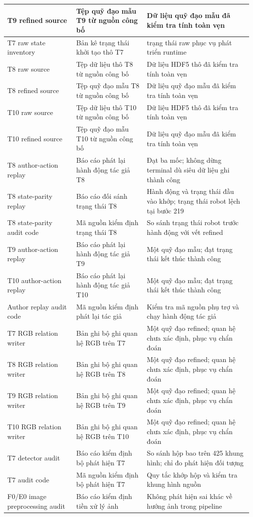 \begin{longtable}{|>{\raggedright\arraybackslash}p{}|>{\raggedright\arraybackslash}p{}|>{\raggedright\arraybackslash}p{}|}
T9 refined source & Tệp quỹ đạo mẫu T9 từ nguồn công bố & Dữ liệu quỹ đạo mẫu đã kiểm tra tính toàn vẹn \\ \hline
T7 raw state inventory & Bản kê trạng thái khởi tạo thô T7 & 120 trạng thái raw phục vụ phát triển runtime \\ \hline
T8 raw source & Tệp dữ liệu thô T8 từ nguồn công bố & Dữ liệu HDF5 thô đã kiểm tra tính toàn vẹn \\ \hline
T8 refined source & Tệp quỹ đạo mẫu T8 từ nguồn công bố & Dữ liệu quỹ đạo mẫu đã kiểm tra tính toàn vẹn \\ \hline
T10 raw source & Tệp dữ liệu thô T10 từ nguồn công bố & Dữ liệu HDF5 thô đã kiểm tra tính toàn vẹn \\ \hline
T10 refined source & Tệp quỹ đạo mẫu T10 từ nguồn công bố & Dữ liệu quỹ đạo mẫu đã kiểm tra tính toàn vẹn \\ \hline
T8 author-action replay & Báo cáo phát lại hành động tác giả T8 & Đạt ba mốc; không dừng terminal dù siêu dữ liệu ghi thành công \\ \hline
T8 state-parity replay & Báo cáo đối sánh trạng thái T8 & Hành động và trạng thái đầu vào khớp; trạng thái robot lệch tại bước 219 \\ \hline
T8 state-parity audit code & Mã nguồn kiểm định trạng thái T8 & So sánh trạng thái robot trước hành động với vết refined \\ \hline
T9 author-action replay & Báo cáo phát lại hành động tác giả T9 & Một quỹ đạo mẫu; đạt trạng thái kết thúc thành công \\ \hline
T10 author-action replay & Báo cáo phát lại hành động tác giả T10 & Một quỹ đạo mẫu; đạt trạng thái kết thúc thành công \\ \hline
Author replay audit code & Mã nguồn kiểm định phát lại tác giả & Kiểm tra mã nguồn phụ trợ và chạy hành động tác giả \\ \hline
T7 RGB relation writer & Bản ghi bộ ghi quan hệ RGB trên T7 & Một quỹ đạo refined; quan hệ chưa xác định, phục vụ chẩn đoán \\ \hline
T8 RGB relation writer & Bản ghi bộ ghi quan hệ RGB trên T8 & Một quỹ đạo refined; quan hệ chưa xác định, phục vụ chẩn đoán \\ \hline
T9 RGB relation writer & Bản ghi bộ ghi quan hệ RGB trên T9 & Một quỹ đạo refined; quan hệ chưa xác định, phục vụ chẩn đoán \\ \hline
T10 RGB relation writer & Bản ghi bộ ghi quan hệ RGB trên T10 & Một quỹ đạo refined; quan hệ chưa xác định, phục vụ chẩn đoán \\ \hline
T7 detector audit & Báo cáo kiểm định bộ phát hiện T7 & So sánh hộp bao trên 425 khung hình; chỉ đo phát hiện đối tượng \\ \hline
T7 audit code & Mã nguồn kiểm định bộ phát hiện T7 & Quy tắc khớp hộp và kiểm tra khung hình nguồn \\ \hline
F0/E0 image preprocessing audit & Báo cáo kiểm định tiền xử lý ảnh & Không phát hiện sai khác về hướng ảnh trong pipeline \\ \hline
\end{longtable}
